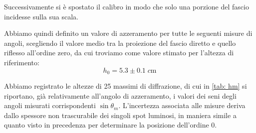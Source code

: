 \documentclass[10pt, a4paper, italian]{article}
\begin{document}
Successivamente si è spostato il calibro in modo che solo una porzione del
fascio incidesse sulla sua scala.

Abbiamo quindi definito un valore di azzeramento per tutte le seguenti misure di
angoli, scegliendo il valore medio tra la proiezione del fascio diretto e
quello riflesso all'ordine zero, da cui troviamo come valore stimato per
l'altezza di riferimento:
\[
h_0 = 5.3 \pm 0.1 \; \si{c\m}
\]

Abbiamo registrato le altezze di 25 massimi di diffrazione, di cui in \cref{tab: hm} si
riportano, già relativamente all'angolo di azzeramento, i valori dei seni degli angoli
misurati corrispondenti $\sin{\theta_m}$. L'incertezza associata alle misure deriva dallo
spessore non trascurabile dei singoli spot luminosi, in maniera simile a quanto
visto in precedenza per determinare la posizione dell'ordine 0.
\end{document}
